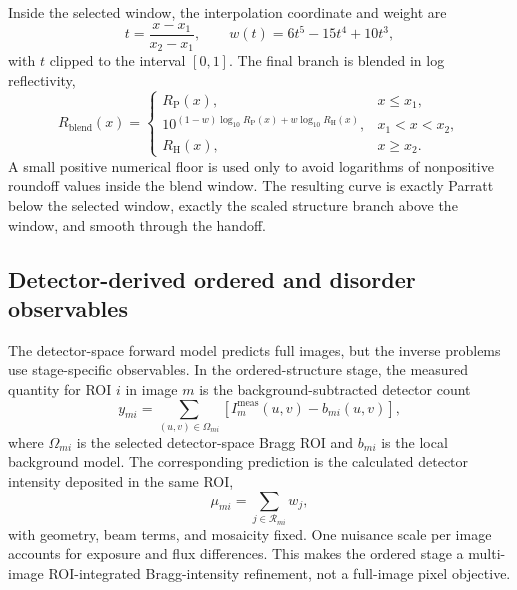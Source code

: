 \documentclass[11pt]{article}
\begin{document}
Inside the selected window, the interpolation coordinate and weight are
\begin{equation}
  t=\frac{x-x_1}{x_2-x_1},
  \qquad
  w(t)=6t^5-15t^4+10t^3,
  \label{eq:si_handoff_smoothstep}
\end{equation}
with $t$ clipped to the interval $[0,1]$. The final branch is blended in log
reflectivity,
\begin{equation}
R_{\mathrm{blend}}(x)=
\begin{cases}
R_{\mathrm P}(x), & x\le x_1,\\[3pt]
10^{(1-w)\log_{10}R_{\mathrm P}(x)+w\log_{10}R_{\mathrm H}(x)},
  & x_1<x<x_2,\\[3pt]
R_{\mathrm H}(x), & x\ge x_2.
\end{cases}
\label{eq:si_handoff_blend}
\end{equation}
A small positive numerical floor is used only to avoid logarithms of nonpositive
roundoff values inside the blend window. The resulting curve is exactly
Parratt below the selected window, exactly the scaled structure branch above the
window, and smooth through the handoff.

\subsection{Detector-derived ordered and disorder observables}
\label{subsec:si_detector_derived_objectives}

The detector-space forward model predicts full images, but the inverse problems use stage-specific observables. In the ordered-structure stage, the measured quantity for ROI $i$ in image $m$ is the background-subtracted detector count
\[
  y_{mi}=\sum_{(u,v)\in\Omega_{mi}}\left[I_m^{\mathrm{meas}}(u,v)-b_{mi}(u,v)\right],
\]
where $\Omega_{mi}$ is the selected detector-space Bragg ROI and $b_{mi}$ is the local background model. The corresponding prediction is the calculated detector intensity deposited in the same ROI,
\[
  \mu_{mi}=\sum_{j\in\mathcal{R}_{mi}} w_j,
\]
with geometry, beam terms, and mosaicity fixed. One nuisance scale per image accounts for exposure and flux differences. This makes the ordered stage a multi-image ROI-integrated Bragg-intensity refinement, not a full-image pixel objective.
\end{document}
